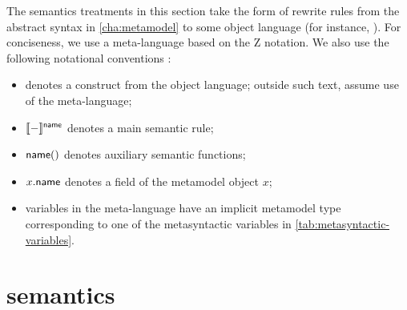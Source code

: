 The semantics treatments in this section take the form of rewrite rules from
the abstract syntax in \cref{cha:metamodel} to some object language (for
instance, \tockcsp).
For conciseness, we use a meta-language based on the Z notation.
We also use the following notational conventions :

\begin{itemize}
\item
	 denotes a construct from the object
	language; outside such text, assume use of the meta-language;
\item
	\(\llbracket - \rrbracket^{\mathsf{name}}\) denotes a main semantic rule;
\item
	\(\mathsf{name}()\) denotes auxiliary semantic functions;
\item
	\(x.\mathsf{name}\) denotes a field of the metamodel object \(x\);
\item
	variables in the meta-language have an implicit metamodel type
	corresponding to one of the metasyntactic variables in
	\cref{tab:metasyntactic-variables}.
\end{itemize}

\section{\tockcsp{} semantics}\label{sec:semantics-tockcsp}

